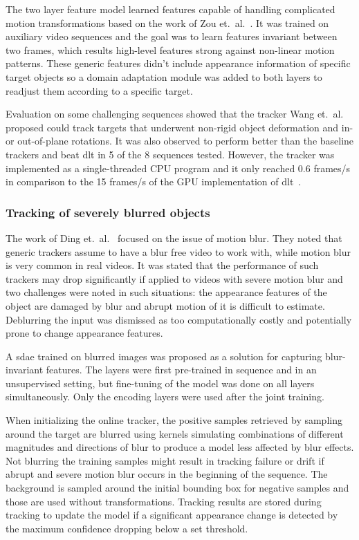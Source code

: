 The two layer feature model learned features capable of handling complicated motion
transformations based on the work of Zou et.~al.~\cite{INVARIANT_FEATS}. It was trained
on auxiliary video sequences and the goal was to learn features invariant between two
frames, which results high-level features strong against non-linear motion patterns. These
generic features didn't include appearance information of specific target objects so a
domain adaptation module was added to both layers to readjust them according to a
specific target.~\cite{LEARNED_HIERARCH}

Evaluation on some challenging sequences showed that the tracker Wang et.~al.~\cite{LEARNED_HIERARCH}
proposed could track targets that underwent non-rigid object deformation and in- or
out-of-plane rotations. It was also observed to perform better than the baseline trackers
and beat \ac{dlt} in 5 of the 8 sequences tested. However, the tracker was implemented
as a single-threaded CPU program and it only reached 0.6 frames/s in comparison to the 15
frames/s of the GPU implementation of \ac{dlt}~\cite{DLT}.

\subsubsection{Tracking of severely blurred objects}
The work of Ding et.~al.~\cite{BLUR_TRACK} focused on the issue of motion blur. They noted
that generic trackers assume to have a blur free video to work with, while motion blur is
very common in real videos. It was stated that the performance of such trackers may drop
significantly if applied to videos with severe motion blur and two challenges were
noted in such situations: the appearance features of the object are damaged by blur
and abrupt motion of it is difficult to estimate. Deblurring the input was dismissed as
too computationally costly and potentially prone to change appearance features.~\cite{BLUR_TRACK}

A \ac{sdae} trained on blurred images was proposed as a solution for capturing blur-invariant
features. The layers were first pre-trained in sequence and in an unsupervised setting,
but fine-tuning of the model was done on all layers simultaneously. Only the encoding
layers were used after the joint training.~\cite{BLUR_TRACK}

When initializing the online tracker, the positive samples retrieved by sampling around
the target are blurred using kernels simulating combinations of different magnitudes
and directions of blur to produce a model less affected by blur effects. Not blurring
the training samples might result in tracking failure or drift if abrupt and severe
motion blur occurs in the beginning of the sequence. The background is sampled around
the initial bounding box for negative samples and those are used without transformations.
Tracking results are stored during tracking to update the model if a significant
appearance change is detected by the maximum confidence dropping below a set
threshold.~\cite{BLUR_TRACK}

